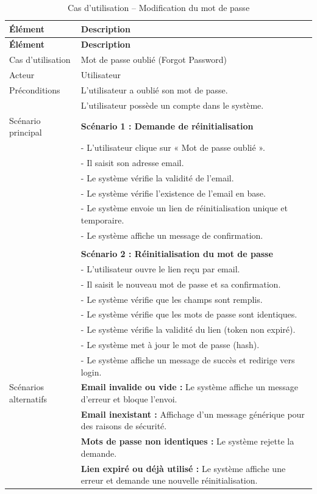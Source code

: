 {
\begin{longtable}{|l|p{12cm}|}
\caption{Cas d'utilisation -- Modification du mot de passe}
\label{tab:password_modification} \\
\hline
\textbf{Élément} & \textbf{Description} \\
\hline
\endfirsthead
\hline
\textbf{Élément} & \textbf{Description} \\
\hline
\endhead

Cas d'utilisation & Mot de passe oublié (Forgot Password) \\
\hline

Acteur & Utilisateur \\
\hline

Préconditions &
L'utilisateur a oublié son mot de passe. \\
& L'utilisateur possède un compte dans le système. \\
\hline

Scénario principal &
\textbf{Scénario 1 : Demande de réinitialisation} \\
&- L'utilisateur clique sur « Mot de passe oublié ». \\
&- Il saisit son adresse email. \\
&- Le système vérifie la validité de l'email. \\
&- Le système vérifie l'existence de l'email en base. \\
&- Le système envoie un lien de réinitialisation unique et temporaire. \\
&- Le système affiche un message de confirmation. \\
\\
& \textbf{Scénario 2 : Réinitialisation du mot de passe} \\
&- L'utilisateur ouvre le lien reçu par email. \\
&- Il saisit le nouveau mot de passe et sa confirmation. \\
&- Le système vérifie que les champs sont remplis. \\
&- Le système vérifie que les mots de passe sont identiques. \\
&- Le système vérifie la validité du lien (token non expiré). \\
&- Le système met à jour le mot de passe (hash). \\
&- Le système affiche un message de succès et redirige vers login. \\
\hline

Scénarios alternatifs &
\textbf{Email invalide ou vide :} Le système affiche un message d'erreur et bloque l'envoi. \\
& \textbf{Email inexistant :} Affichage d'un message générique pour des raisons de sécurité. \\
& \textbf{Mots de passe non identiques :} Le système rejette la demande. \\
& \textbf{Lien expiré ou déjà utilisé :} Le système affiche une erreur et demande une nouvelle réinitialisation. \\
\hline


\end{longtable}}
